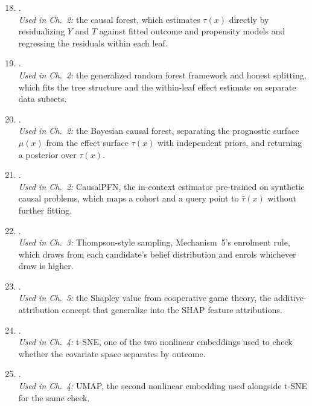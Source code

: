 \begin{enumerate}\setcounter{enumi}{17}
  \item \citet{wager2018}.
    \\\textit{Used in Ch.~2:} the causal forest, which estimates $\tau(x)$
    directly by residualizing $Y$ and $T$ against fitted outcome and
    propensity models and regressing the residuals within each leaf.

  \item \citet{athey2019grf}.
    \\\textit{Used in Ch.~2:} the generalized random forest framework and
    honest splitting, which fits the tree structure and the within-leaf
    effect estimate on separate data subsets.

  \item \citet{hahn2020bcf}.
    \\\textit{Used in Ch.~2:} the Bayesian causal forest, separating the
    prognostic surface $\mu(x)$ from the effect surface $\tau(x)$ with
    independent priors, and returning a posterior over $\tau(x)$.

  \item \citet{balazadeh2025causalpfn}.
    \\\textit{Used in Ch.~2:} CausalPFN, the in-context estimator
    pre-trained on synthetic causal problems, which maps a cohort and a
    query point to $\hat\tau(x)$ without further fitting.

  \item \citet{thompson1933}.
    \\\textit{Used in Ch.~3:} Thompson-style sampling, Mechanism~5's enrolment
    rule, which draws from each candidate's belief distribution and enrols
    whichever draw is higher.

  \item \citet{shapley1953}.
    \\\textit{Used in Ch.~5:} the Shapley value from cooperative game theory,
    the additive-attribution concept that \citet{lundberg2017shap} generalize
    into the SHAP feature attributions.

  \item \citet{vandermaaten2008tsne}.
    \\\textit{Used in Ch.~4:} t-SNE, one of the two nonlinear embeddings used
    to check whether the covariate space separates by outcome.

  \item \citet{mcinnes2018umap}.
    \\\textit{Used in Ch.~4:} UMAP, the second nonlinear embedding used
    alongside t-SNE for the same check.


\end{enumerate}

